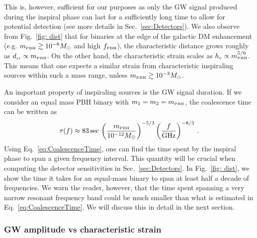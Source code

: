 \documentclass[11pt,a4paper]{article}
\newcommand{\PBH}{\text{\tiny PBH}}
\begin{document}
This is, however, sufficient for our purposes as only the GW signal produced during the inspiral phase can last for a sufficiently long time to allow for potential detection (see more details in Sec.~\ref{sec:Detectors}). 
We also observe from Fig.~\ref{fig: dist} that for binaries at the edge of the galactic DM enhancement (e.g. $m_\PBH \gtrsim 10^{-6} M_\odot$ and high $f_\PBH $), the characteristic distance grows roughly as $d_\text{\tiny yr}\propto m_\PBH$. On the other hand, the characteristic strain scales as $h_c \propto m_\PBH^{5/6}$. 
This means that one expects a similar strain from characteristic inspiraling sources within such a mass range, unless $m_\PBH \gtrsim 10^{-3} M_\odot$.


An important property of inspiraling sources is the GW signal duration. If we consider an equal mass PBH binary with $m_1 = m_2 = m_\PBH$, the coalescence time can be written as~\cite{Maggiore:1900zz}
\begin{equation}
\label{eq:CoalescenceTime}
\tau(f) \approx 83 \, {\rm{sec}} \, \left(\frac{m_\PBH}{10^{-12} M_\odot}\right)^{-5/3} \left(\frac{f}{\rm{GHz}}\right)^{-8/3} \,.
\end{equation}
Using Eq.~\eqref{eq:CoalescenceTime}, one can find the time spent by the inspiral phase to span a given frequency interval.
This quantity will be crucial when computing the detector sensitivities in Sec.~\ref{sec:Detectors}.
In Fig.~\ref{fig: dist}, we show the time it takes for an equal-mass binary to span at least half a decade of frequencies. 
We warn the reader, however, that the time spent spanning a very narrow resonant frequency band could be much smaller than what is estimated in Eq.~\eqref{eq:CoalescenceTime}. We will discuss this in detail in the next section.



\subsubsection{GW amplitude vs characteristic strain}
\end{document}
